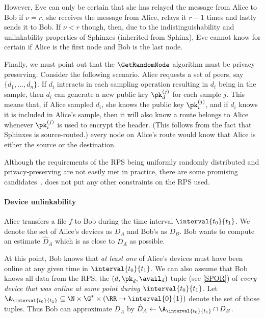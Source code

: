 However, Eve can only be certain that she has relayed the message from Alice to 
Bob if \(\nu = r\), \ie she receives the message from Alice, relays it \(r-1\) 
times and lastly sends it to Bob.
If \(\nu < r\) though, then, due to the indistinguishability and unlinkability 
properties of Sphinxes (inherited from Sphinx), Eve cannot know for certain if 
Alice is the first node and Bob is the last node. 


Finally, we must point out that the \(\GetRandomNode\) algorithm must be 
privacy preserving.
Consider the following scenario.
Alice requests a set of peers, say \(\{d_1, \dotsc, d_n\}\).
If \(d_i\) interacts in each sampling operation resulting in \(d_i\) being in 
the sample, then \(d_i\) can generate a new public key \(\pk_d^{(j)}\) for each 
sample \(j\).
This means that, if Alice sampled \(d_i\), she knows the public key 
\(\pk_i^{(j)}\), and if \(d_i\) knows it is included in Alice's sample, then it 
will also know a route belongs to Alice whenever \(\pk_i^{(j)}\) is used to 
encrypt the header.
(This follows from the fact that Sphinxes is source-routed.)
\Ie every node on Alice's route would know that Alice is either the source or 
the destination.

Although the requirements of the \ac{RPS} being uniformly randomly
distributed and privacy-preserving are not easily met in practice,
there are some promising candidates~\cite[\eg][]{Octopus,BrahmsRPS}.
\name does not put any other constraints on the \ac{RPS} used.

\paragraph*{Device unlinkability}

Alice transfers a file \(f\) to Bob during the time interval 
\(\interval{t_0}{t_1}\).
We denote the set of Alice's devices as \(D_A\) and Bob's as \(D_B\).
Bob wants to compute an estimate \(\hat D_A\) which is as close to \(D_A\) as 
possible.

At this point, Bob knows that \emph{at least one} of Alice's devices must have 
been online at any given time in \(\interval{t_0}{t_1}\).
We can also assume that Bob knows all data from the \ac{RPS}, \ie the \((d, 
  \pk_d, \avail_d)\) tuple (see \cref{SPOR}) of \emph{every device that was 
  online at some point during \(\interval{t_0}{t_1}\)}.
Let \(\A_{\interval{t_0}{t_1}}\subseteq \N\times \G^*\times (\RR\to 
  \interval{0}{1})\) denote the set of those tuples.
Thus Bob can approximate \(D_A\) by \(\hat D_A \gets 
  \A_{\interval{t_0}{t_1}}\cap D_B\).

